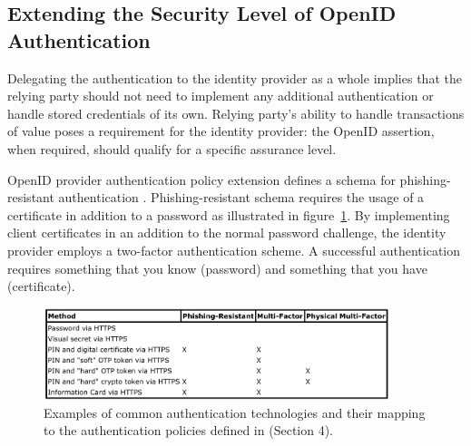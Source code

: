 \documentclass[english,gradu]{tktltiki}
\begin{document}




\subsection{Extending the Security Level of OpenID Authentication} %
\label{sub:extending_the_security_level_of_openid_authentication}

    Delegating the authentication to the identity provider as a whole implies that the relying party should not need to implement any additional authentication or handle stored credentials of its own. Relying party's ability to handle transactions of value poses a requirement for the identity provider: the OpenID assertion, when required, should qualify for a specific assurance level.

    OpenID provider authentication policy extension defines a schema for phishing-resistant authentication \cite{openid_2.0_pape_07}. Phishing-resistant schema requires the usage of a certificate in addition to a password as illustrated in figure~\ref{fig:openid_policy_examples}. By implementing client certificates in an addition to the normal password challenge, the identity provider employs a two-factor authentication scheme. A successful authentication requires something that you know (password) and something that you have (certificate).



\begin{figure}
  \centering
  \includegraphics[width=0.9\textwidth]{images/openid_authentication_policy_examples.jpg}
  \caption{Examples of common authentication technologies and their mapping to the authentication policies defined in \cite{openid_2.0_pape_07} (Section 4).}
  \label{fig:openid_policy_examples}
\end{figure}
\end{document}
